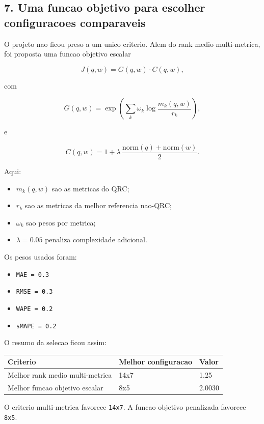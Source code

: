\documentclass[12pt]{article}
\providecommand{\tightlist}{%
          \setlength{\itemsep}{0pt}\setlength{\parskip}{0pt}}
\begin{document}
\subsection{7. Uma funcao objetivo para escolher configuracoes comparaveis}\label{7-uma-funcao-objetivo-para-escolher-configuracoes-comparaveis}

O projeto nao ficou preso a um unico criterio. Alem do rank medio multi-metrica, foi proposta uma funcao objetivo escalar

\[
J(q, w) = G(q, w) \cdot C(q, w),
\]

com

\[
G(q, w) = \exp\left(\sum_k \omega_k \log\frac{m_k(q, w)}{r_k}\right),
\]

e

\[
C(q, w) = 1 + \lambda \, \frac{\mathrm{norm}(q) + \mathrm{norm}(w)}{2}.
\]

Aqui:

\begin{itemize}
\tightlist
\item
  \(m_k(q, w)\) sao as metricas do QRC;
\item
  \(r_k\) sao as metricas da melhor referencia nao-QRC;
\item
  \(\omega_k\) sao pesos por metrica;
\item
  \(\lambda = 0.05\) penaliza complexidade adicional.
\end{itemize}

Os pesos usados foram:

\begin{itemize}
\tightlist
\item
  \texttt{MAE\ =\ 0.3}
\item
  \texttt{RMSE\ =\ 0.3}
\item
  \texttt{WAPE\ =\ 0.2}
\item
  \texttt{sMAPE\ =\ 0.2}
\end{itemize}

O resumo da selecao ficou assim:

\begin{longtable}[]{@{}lll@{}}
\toprule\noalign{}
Criterio & Melhor configuracao & Valor \\
\midrule\noalign{}
\endhead
\bottomrule\noalign{}
\endlastfoot
Melhor rank medio multi-metrica & 14x7 & 1.25 \\
Melhor funcao objetivo escalar & 8x5 & 2.0030 \\
\end{longtable}

O criterio multi-metrica favorece \texttt{14x7}. A funcao objetivo penalizada favorece \texttt{8x5}.
\end{document}
